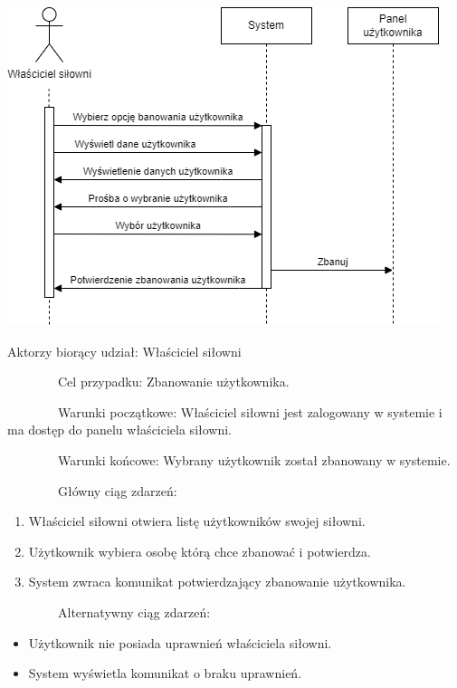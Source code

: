 {\includegraphics{../diagrams/sequence/zbanuj_uzytkownika}}

{Aktorzy biorący udział: Właściciel siłowni}

{~~~~~~~~Cel przypadku: Zbanowanie użytkownika.}

{~~~~~~~~Warunki początkowe: Właściciel siłowni jest zalogowany w
systemie i ma dostęp do panelu właściciela siłowni.}

{~~~~~~~~Warunki końcowe: Wybrany użytkownik został zbanowany w
systemie.}

{~~~~~~~~Główny ciąg zdarzeń:}

\begin{enumerate}
\tightlist
\item
  {Właściciel siłowni otwiera listę użytkowników swojej siłowni.}
\item
  {Użytkownik wybiera osobę którą chce zbanować i potwierdza.}
\item
  {System zwraca komunikat potwierdzający zbanowanie użytkownika.}
\end{enumerate}

{~~~~~~~~Alternatywny ciąg zdarzeń:}

\begin{itemize}
\tightlist
\item
  {Użytkownik nie posiada uprawnień właściciela siłowni.}
\end{itemize}

\begin{itemize}
\tightlist
\item
  {System wyświetla komunikat o braku uprawnień.}
\end{itemize}

